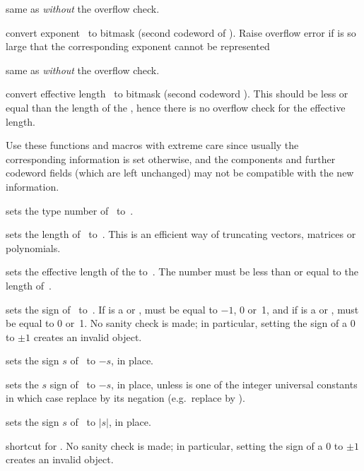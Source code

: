  same as  \emph{without} the
overflow check.

 convert exponent~ to bitmask (second
codeword of ). Raise overflow error if  is so
large that the corresponding exponent cannot be represented

 same as  \emph{without} the
overflow check.

 convert effective length~ to bitmask
(second codeword ). This should be less or equal than the length
of the , hence there is no overflow check for the effective length.

Use these functions and macros with extreme care since usually the
corresponding information is set otherwise, and the components and further
codeword fields (which are left unchanged) may not be compatible with the new
information.

 sets the type number of~ to~.

 sets the length of~ to~. This
is an efficient way of truncating vectors, matrices or polynomials.

 sets the effective length
of the   to~. The number  must be less than or
equal to the length of~.

 sets the sign of~ to~.
If  is a  or ,  must be equal to $-1$, 0
or~1, and if  is a  or ,  must be equal to 0
or~1. No sanity check is made; in particular, setting the sign of a
$0$  to $\pm1$ creates an invalid object.

 sets the sign $s$ of~ to $-s$, in place.

 sets the $s$ sign of~ to $-s$, in
place, unless  is one of the integer universal constants in which case
replace  by its negation (e.g.~replace  by ).

 sets the sign $s$ of~ to $|s|$, in place.

 shortcut for .
No sanity check is made; in particular, setting the sign of a
$0$  to $\pm1$ creates an invalid object.


